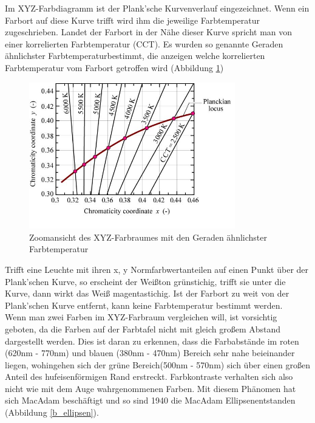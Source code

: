 
Im XYZ-Farbdiagramm ist der Plank'sche Kurvenverlauf eingezeichnet. Wenn ein Farbort auf diese Kurve trifft wird ihm die jeweilige Farbtemperatur zugeschrieben. Landet der Farbort in der Nähe dieser Kurve spricht man von einer korrelierten Farbtemperatur (CCT).  Es wurden so genannte \glqq Geraden ähnlichster Farbtemperatur\grqq bestimmt, die anzeigen welche korrelierten Farbtemperatur vom Farbort getroffen wird (Abbildung \ref{b_cct})    

\begin{figure}[H]     %
\centering
\includegraphics[width=0.8\textwidth]{bilder/cct} 
\caption {Zoomansicht des XYZ-Farbraumes mit den \glqq Geraden ähnlichster Farbtemperatur\grqq \protect\footnotemark}\label{b_cct}
\end{figure}


Trifft eine Leuchte mit ihren x, y Normfarbwertanteilen auf einen Punkt über der Plank'schen Kurve, so erscheint der Weißton grünstichig, trifft sie unter die Kurve, dann wirkt das Weiß magentastichig. Ist der Farbort zu weit von der Plank'schen Kurve entfernt, kann keine Farbtemperatur bestimmt werden.\\

Wenn man zwei Farben im XYZ-Farbraum vergleichen will, ist vorsichtig geboten, da die Farben auf der Farbtafel nicht mit gleich großem Abstand dargestellt werden. Dies ist daran zu erkennen, dass die Farbabstände im roten (620nm - 770nm) und blauen (380nm - 470nm) Bereich sehr nahe beieinander liegen, wohingehen sich der grüne Bereich(500nm - 570nm) sich über einen großen Anteil des hufeisenförmigen Rand erstreckt. Farbkontraste verhalten sich also nicht wie mit dem Auge wahrgenommenen Farben. Mit diesem Phänomen hat sich MacAdam beschäftigt und so sind 1940 die \glqq MacAdam Ellipsen\grqq entstanden (Abbildung \ref{b_ellipsen}).

